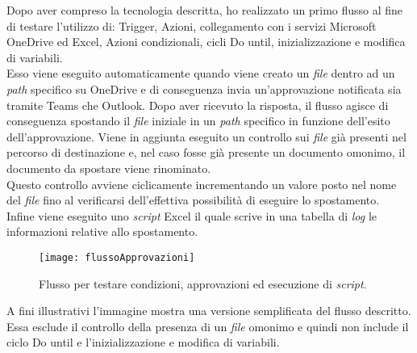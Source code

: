 Dopo aver compreso la tecnologia descritta, ho realizzato un primo flusso al fine di testare l'utilizzo di: Trigger, Azioni, collegamento con i servizi Microsoft OneDrive ed Excel, Azioni condizionali, cicli Do until, inizializzazione e modifica di variabili.\\
Esso viene eseguito automaticamente quando viene creato un \emph{file} dentro ad un \emph{path} specifico su OneDrive e di conseguenza invia un'approvazione notificata sia tramite Teams che Outlook.
Dopo aver ricevuto la risposta, il flusso agisce di conseguenza spostando il \emph{file} iniziale in un \emph{path} specifico in funzione dell'esito dell'approvazione.
Viene in aggiunta eseguito un controllo sui \emph{file} già presenti nel percorso di destinazione e, nel caso fosse già presente un documento omonimo, il documento da spostare viene rinominato.\\
Questo controllo avviene ciclicamente incrementando un valore posto nel nome del \emph{file} fino al verificarsi dell'effettiva possibilità di eseguire lo spostamento.\\
Infine viene eseguito uno \emph{script} Excel il quale scrive in una tabella di \emph{log} le informazioni relative allo spostamento.
\begin{figure}[htbp] 
    \centering 
    \texttt{[image: flussoApprovazioni]} 
    \caption{Flusso per testare condizioni, approvazioni ed esecuzione di \emph{script}.}
    \label{fig:flussoApprovazioni}
\end{figure}
\newline \noindent A fini illustrativi l'immagine mostra una versione semplificata del flusso descritto.
Essa esclude il controllo della presenza di un \emph{file} omonimo e quindi non include il ciclo Do until e l'inizializzazione e modifica di variabili.\\


